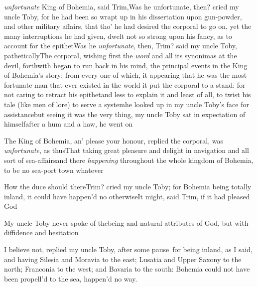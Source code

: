 \documentclass{article}
\begin{document}
 \textit{unfortunate} King of
Bohemia, said Trim,\tsh Was he unfortunate,
then? cried my uncle Toby, for he\break
had been so wrapt up in his dissertation
upon gun-powder, and other military 
affairs, that tho’ he had desired the corporal to go on, yet the many
interruptions he had given, dwelt not so
strong upon his fancy, as
to account for the epithet\tsh Was he \textit{unfortunate},
then, Trim? said my uncle Toby,
pathetically\break\tsh The corporal, wishing first the \textit{word} and
all its synonimas at the devil, forthwith began to run back in his
mind, the principal events in the King of Bohemia’s
story; from every one of which, it appearing that he was the most
fortunate man that ever existed in the world\tsh\break
it put the corporal to a stand: for not caring to retract his epithet\tsh and less
to explain it \tsh and least of all, to twist his tale (like men of lore) to serve a
system\tsh he looked up in my uncle Toby’s face for assistance\tsh but seeing it was
the very thing, my uncle Toby sat in expectation of himself\tsh after a hum and a
haw, he went on\tsh{}

The King of Bohemia, an’ please your honour,
replied the corporal, was \textit{unfortunate}, as
thus\tsh That taking great pleasure and delight in
navigation and all sort of sea-affairs\tsh and there
\textit{happening} throughout the whole kingdom of Bohemia, to
be no sea-port town whatever\tsh

How the duce should there\tsk Trim? cried my
uncle Toby; for Bohemia being totally inland, it
could have happen’d no otherwise\tsh It might, said
Trim, if it had pleased God\tsh

My uncle Toby never spoke of the\break being and natural
attributes of God, but with diffidence and
hesitation\tsh{}

\tsk I believe not, replied my uncle Toby, after
some pause\tsk\ for being inland, as I said, and having
Silesia and Moravia to the east; Lusatia and
Upper Saxony to the north; Franconia to the
west; and Bavaria to the south: Bohemia could not
have been propell’d to the sea, 
happen’d no way.
\end{document}
